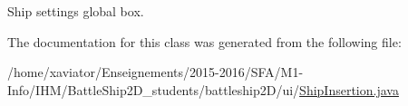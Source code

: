 Ship settings global box. 



The documentation for this class was generated from the following file\-:\begin{DoxyCompactItemize}
\item 
/home/xaviator/\-Enseignements/2015-\/2016/\-S\-F\-A/\-M1-\/\-Info/\-I\-H\-M/\-Battle\-Ship2\-D\-\_\-students/battleship2\-D/ui/\hyperlink{ShipInsertion_8java}{Ship\-Insertion.\-java}\end{DoxyCompactItemize}
